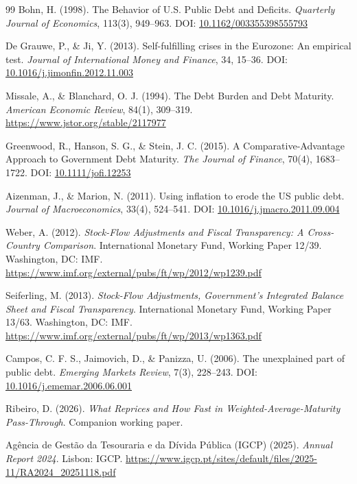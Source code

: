 \documentclass[11pt,a4paper]{article}
\providecommand{\doi}[1]{DOI: \href{https://doi.org/#1}{#1}}
\begin{document}
\begin{thebibliography}{99}
Bohn, H. (1998). The Behavior of U.S. Public Debt and Deficits. \emph{Quarterly
Journal of Economics}, 113(3), 949--963. \doi{10.1162/003355398555793}

De Grauwe, P., \& Ji, Y. (2013). Self-fulfilling crises in the Eurozone: An
empirical test. \emph{Journal of International Money and Finance}, 34, 15--36.
\doi{10.1016/j.jimonfin.2012.11.003}

Missale, A., \& Blanchard, O. J. (1994). The Debt Burden and Debt Maturity.
\emph{American Economic Review}, 84(1), 309--319.
\url{https://www.jstor.org/stable/2117977}

Greenwood, R., Hanson, S. G., \& Stein, J. C. (2015). A Comparative-Advantage
Approach to Government Debt Maturity. \emph{The Journal of Finance}, 70(4),
1683--1722. \doi{10.1111/jofi.12253}

Aizenman, J., \& Marion, N. (2011). Using inflation to erode the US public debt.
\emph{Journal of Macroeconomics}, 33(4), 524--541.
\doi{10.1016/j.jmacro.2011.09.004}

Weber, A. (2012). \emph{Stock-Flow Adjustments and Fiscal Transparency: A
Cross-Country Comparison}. International Monetary Fund, Working Paper 12/39.
Washington, DC: IMF.
\url{https://www.imf.org/external/pubs/ft/wp/2012/wp1239.pdf}

Seiferling, M. (2013). \emph{Stock-Flow Adjustments, Government's Integrated
Balance Sheet and Fiscal Transparency}. International Monetary Fund, Working
Paper 13/63. Washington, DC: IMF.
\url{https://www.imf.org/external/pubs/ft/wp/2013/wp1363.pdf}

Campos, C. F. S., Jaimovich, D., \& Panizza, U. (2006). The unexplained part of
public debt. \emph{Emerging Markets Review}, 7(3), 228--243.
\doi{10.1016/j.ememar.2006.06.001}

Ribeiro, D. (2026). \emph{What Reprices and How Fast in
Weighted-Average-Maturity Pass-Through}. Companion working paper.

Agência de Gestão da Tesouraria e da Dívida Pública (IGCP) (2025).
\emph{Annual Report 2024}. Lisbon: IGCP.
\url{https://www.igcp.pt/sites/default/files/2025-11/RA2024_20251118.pdf}

\end{thebibliography}
\end{document}
